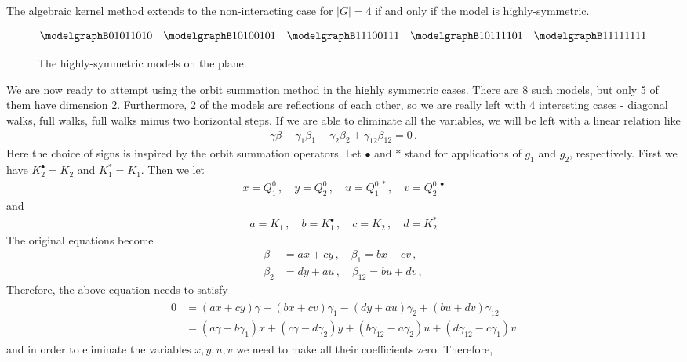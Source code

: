 \begin{corollary} The algebraic kernel method extends to the non-interacting case for $|G| = 4$ if and only if the model is highly-symmetric.
\end{corollary}
\begin{figure}[H]
    \centering
\[
	\modelgraphB 01011010 \quad \modelgraphB10100101  \quad \modelgraphB 11100111  \quad \modelgraphB 10111101  \quad \modelgraphB 11111111 
\]
    \caption{The highly-symmetric models on the plane.}
\end{figure}
We are now ready to attempt using the orbit summation method in the highly symmetric cases. There are 8 such models, but only 5 of them have dimension 2. Furthermore, 2 of the models are reflections of each other, so we are really left with 4 interesting cases - diagonal walks, full walks, full walks minus two horizontal steps. If we are able to eliminate all the variables, we will be left with a linear relation like
\begin{align}
	\gamma \beta- \gamma_1 \beta_1-\gamma_2 \beta_2 + \gamma_{12}\beta_{12} = 0\,.
\end{align}
Here the choice of signs is inspired by the orbit summation operators. Let $\bullet$ and $\ast$ stand for applications of $g_1$ and $g_2$, respectively. First we have $K_2^\bullet = K_2$ and $K_1^\ast = K_1$. Then we let
\begin{align}
	x = Q_1^0\,,\quad y= Q_2^0\,, \quad u= Q_1^{0,\ast}\,,\quad v = Q_2^{0,\bullet}
\end{align}
and
\begin{align}
	a = K_1\,,\quad b = K_1^\bullet\,,\quad c=K_2 \,, \quad d = K_2^\ast
\end{align}
The original equations become
\begin{align}
	\beta &= a x + c y\,,\quad \beta_1 = b x + c v\,,\\
	\beta_2 &= d y + a u\,,\quad \beta_{12} = b u + d v\,,
\end{align}
Therefore, the above equation needs to satisfy
\begin{align}\begin{split}
	0 &= (ax+cy)\gamma - (bx+cv)\gamma_1 - (dy+au)\gamma_2 + (bu +dv) \gamma_{12}\\
	   &= (a\gamma-b\gamma_1)x + (c\gamma-d\gamma_2)y + (b\gamma_{12}-a\gamma_2)u + (d\gamma_{12}-c\gamma_1)v
\end{split}\end{align}
and in order to eliminate the variables $x,y,u,v$ we need to make all their coefficients zero. Therefore,
